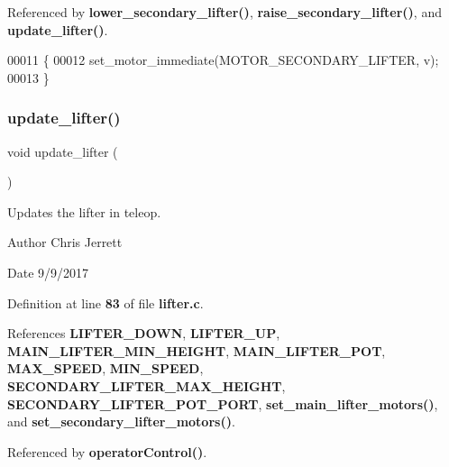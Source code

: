Referenced by \textbf{ lower\+\_\+secondary\+\_\+lifter()}, \textbf{ raise\+\_\+secondary\+\_\+lifter()}, and \textbf{ update\+\_\+lifter()}.


\begin{DoxyCode}
00011                                               \{
00012   set_motor_immediate(MOTOR_SECONDARY_LIFTER, v);
00013 \}
\end{DoxyCode}
\mbox{\label{lifter_8c_a59bb7413777ca16aba124aaedf95c79b}} 
\subsubsection{update\+\_\+lifter()}
{\footnotesize\ttfamily void update\+\_\+lifter (\begin{DoxyParamCaption}{ }\end{DoxyParamCaption})}



Updates the lifter in teleop. 

\begin{DoxyAuthor}{Author}
Chris Jerrett 
\end{DoxyAuthor}
\begin{DoxyDate}{Date}
9/9/2017 
\end{DoxyDate}


Definition at line \textbf{ 83} of file \textbf{ lifter.\+c}.



References \textbf{ L\+I\+F\+T\+E\+R\+\_\+\+D\+O\+WN}, \textbf{ L\+I\+F\+T\+E\+R\+\_\+\+UP}, \textbf{ M\+A\+I\+N\+\_\+\+L\+I\+F\+T\+E\+R\+\_\+\+M\+I\+N\+\_\+\+H\+E\+I\+G\+HT}, \textbf{ M\+A\+I\+N\+\_\+\+L\+I\+F\+T\+E\+R\+\_\+\+P\+OT}, \textbf{ M\+A\+X\+\_\+\+S\+P\+E\+ED}, \textbf{ M\+I\+N\+\_\+\+S\+P\+E\+ED}, \textbf{ S\+E\+C\+O\+N\+D\+A\+R\+Y\+\_\+\+L\+I\+F\+T\+E\+R\+\_\+\+M\+A\+X\+\_\+\+H\+E\+I\+G\+HT}, \textbf{ S\+E\+C\+O\+N\+D\+A\+R\+Y\+\_\+\+L\+I\+F\+T\+E\+R\+\_\+\+P\+O\+T\+\_\+\+P\+O\+RT}, \textbf{ set\+\_\+main\+\_\+lifter\+\_\+motors()}, and \textbf{ set\+\_\+secondary\+\_\+lifter\+\_\+motors()}.



Referenced by \textbf{ operator\+Control()}.


